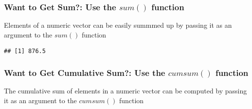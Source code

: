 \subsubsection{Want to Get Sum?: Use the $sum()$ function}
\noindent Elements of a numeric vector can be easily summmed up by passing it as an argument to the $sum()$ function
\begin{knitrout}
\color{fgcolor}\begin{kframe}
\begin{alltt}
\hlopt{$}
\end{alltt}
\begin{verbatim}
## [1] 876.5
\end{verbatim}
\end{kframe}
\end{knitrout}
\subsubsection{Want to Get Cumulative Sum?: Use the $cumsum()$ function}
\noindent The cumulative sum of elements in a numeric vector can be computed by passing it as an argument to the $cumsum()$ function
\begin{knitrout}
\color{fgcolor}\begin{kframe}
\begin{alltt}
\hlopt{$}
\end{alltt}
\end{kframe}
\end{knitrout}
